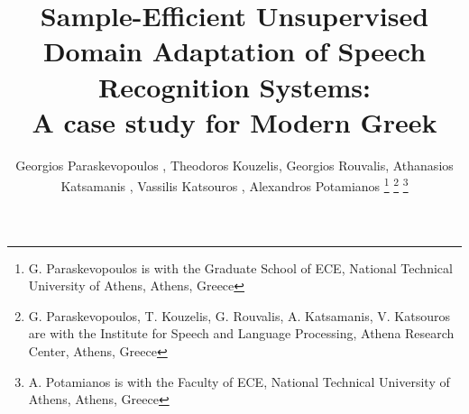 \documentclass[journal]{IEEEtran}
\begin{document}
\title{Sample-Efficient Unsupervised Domain Adaptation of Speech Recognition Systems:\\ A case study for Modern Greek}
\author{Georgios Paraskevopoulos
, Theodoros Kouzelis, Georgios Rouvalis, Athanasios Katsamanis , Vassilis Katsouros , Alexandros Potamianos 
\thanks{G. Paraskevopoulos is with the Graduate School
of ECE, National Technical University of Athens, Athens, Greece}
\thanks{G. Paraskevopoulos, T. Kouzelis, G. Rouvalis, A. Katsamanis, V. Katsouros are with the Institute for Speech and Language Processing, Athena Research Center, Athens, Greece}
\thanks{A. Potamianos is with the Faculty of ECE, National Technical University of Athens, Athens, Greece}
}


\maketitle
\end{document}
